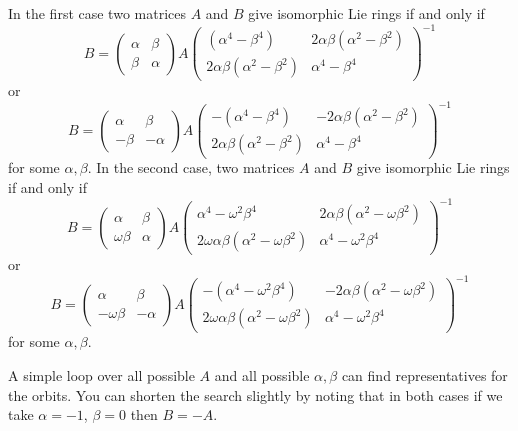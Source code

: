 \documentclass[12pt]{article}
\begin{document}
In the first case two matrices $A$ and $B$ give isomorphic Lie rings if and
only if%
\[
B=\left( 
\begin{array}{ll}
\alpha  & \beta  \\ 
\beta  & \alpha 
\end{array}%
\right) A\left( 
\begin{array}{ll}
(\alpha ^{4}-\beta ^{4}) & 2\alpha \beta (\alpha ^{2}-\beta ^{2}) \\ 
2\alpha \beta (\alpha ^{2}-\beta ^{2}) & \alpha ^{4}-\beta ^{4}%
\end{array}%
\right) ^{-1}
\]%
or 
\[
B=\left( 
\begin{array}{ll}
\alpha  & \beta  \\ 
-\beta  & -\alpha 
\end{array}%
\right) A\left( 
\begin{array}{ll}
-(\alpha ^{4}-\beta ^{4}) & -2\alpha \beta (\alpha ^{2}-\beta ^{2}) \\ 
2\alpha \beta (\alpha ^{2}-\beta ^{2}) & \alpha ^{4}-\beta ^{4}%
\end{array}%
\right) ^{-1}
\]%
for some $\alpha ,\beta $. In the second case, two matrices $A$ and $B$ give
isomorphic Lie rings if and only if%
\[
B=\left( 
\begin{array}{ll}
\alpha  & \beta  \\ 
\omega \beta  & \alpha 
\end{array}%
\right) A\left( 
\begin{array}{ll}
\alpha ^{4}-\omega ^{2}\beta ^{4} & 2\alpha \beta (\alpha ^{2}-\omega \beta
^{2}) \\ 
2\omega \alpha \beta (\alpha ^{2}-\omega \beta ^{2}) & \alpha ^{4}-\omega
^{2}\beta ^{4}%
\end{array}%
\right) ^{-1}
\]%
or 
\[
B=\left( 
\begin{array}{ll}
\alpha  & \beta  \\ 
-\omega \beta  & -\alpha 
\end{array}%
\right) A\left( 
\begin{array}{ll}
-(\alpha ^{4}-\omega ^{2}\beta ^{4}) & -2\alpha \beta (\alpha ^{2}-\omega
\beta ^{2}) \\ 
2\omega \alpha \beta (\alpha ^{2}-\omega \beta ^{2}) & \alpha ^{4}-\omega
^{2}\beta ^{4}%
\end{array}%
\right) ^{-1}
\]%
for some $\alpha ,\beta $.

A simple loop over all possible $A$ and all possible $\alpha ,\beta $ can
find representatives for the orbits. You can shorten the search slightly by
noting that in both cases if we take $\alpha =-1$, $\beta =0$ then $B=-A$.
\end{document}
